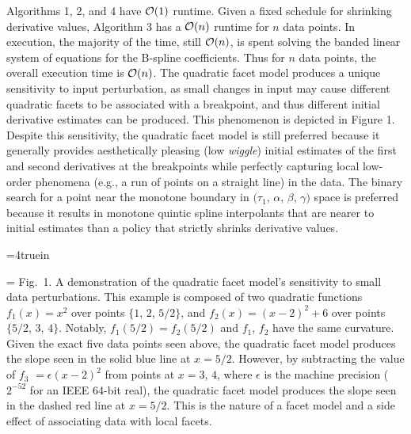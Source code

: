Algorithms 1, 2, and 4 have ${\cal O}(1)$ runtime. Given a fixed
schedule for shrinking derivative values, Algorithm 3 has a ${\cal
  O}(n)$ runtime for $n$ data points. In execution, the majority of
the time, still ${\cal O}(n)$, is spent solving the banded linear
system of equations for the B-spline coefficients. Thus for $n$ data
points, the overall execution time is ${\cal O}(n)$. The quadratic
facet model produces a unique sensitivity to input perturbation, as
small changes in input may cause different quadratic facets to be
associated with a breakpoint, and thus different initial derivative
estimates can be produced. This phenomenon is depicted in Figure
1. Despite this sensitivity, the quadratic facet model is still
preferred because it generally provides aesthetically pleasing (low
{\it wiggle}) initial estimates of the first and second derivatives at
the breakpoints while perfectly capturing local low-order phenomena
(e.g., a run of points on a straight line) in the data. The binary
search for a point near the monotone boundary in $(\tau_1$, $\alpha$,
$\beta$, $\gamma)$ space is preferred because it results in monotone
quintic spline interpolants that are nearer to initial estimates than
a policy that strictly shrinks derivative values.

\topinsert
\centerline{\epsfxsize=4truein }
{\everymath={\scriptstyle}
\narrower\noindent\rmVIII Fig.\ 1. A demonstration of the quadratic
  facet model's sensitivity to small data perturbations. This example is
  composed of two quadratic functions $f_1(x) = x^2$ over points $\{1$,
  $2$, $5/2\}$, and $f_2(x) = (x-2)^2 + 6$ over points $\{5/2$, $3$,
  $4\}$. Notably, $f_1(5/2) = f_2(5/2)$ and $f_1$, $f_2$ have the same
  curvature. Given the exact five data points seen above, the quadratic
  facet model produces the slope seen in the solid blue line at $x = 5/2$.
  However, by subtracting the value of $f_3$ $= \epsilon(x-2)^2$ from
  points at $x = 3$, $4$, where $\epsilon$ is the machine precision
  ($2^{-52}$ for an IEEE 64-bit real), the quadratic facet model produces
  the slope seen in the dashed red line at $x = 5/2$. This is the nature
  of a facet model and a side effect of associating data with local facets.
\par} \endinsert
